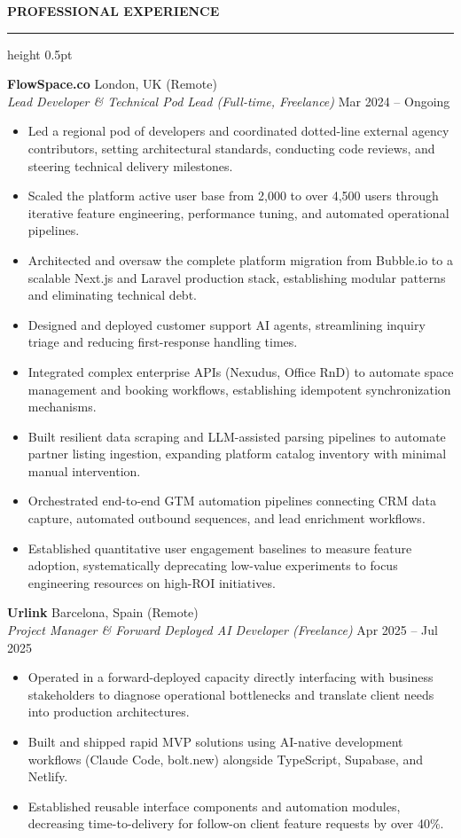 \documentclass[10pt, a4paper]{article}
\newcommand{\cvsection}[1]{%
  \vspace{6pt}%
  {\normalsize\bfseries\MakeUppercase{#1}}%
  \vspace{2pt}%
  \hrule height 0.5pt%
  \vspace{4pt}%
}
\begin{document}
\cvsection{Professional Experience}

\textbf{FlowSpace.co} \hfill London, UK (Remote)\\
\textit{Lead Developer \& Technical Pod Lead (Full-time, Freelance)} \hfill Mar 2024 -- Ongoing
\begin{itemize}
  \item Led a regional pod of developers and coordinated dotted-line external agency contributors, setting architectural standards, conducting code reviews, and steering technical delivery milestones.
  \item Scaled the platform active user base from 2,000 to over 4,500 users through iterative feature engineering, performance tuning, and automated operational pipelines.
  \item Architected and oversaw the complete platform migration from Bubble.io to a scalable Next.js and Laravel production stack, establishing modular patterns and eliminating technical debt.
  \item Designed and deployed customer support AI agents, streamlining inquiry triage and reducing first-response handling times.
  \item Integrated complex enterprise APIs (Nexudus, Office RnD) to automate space management and booking workflows, establishing idempotent synchronization mechanisms.
  \item Built resilient data scraping and LLM-assisted parsing pipelines to automate partner listing ingestion, expanding platform catalog inventory with minimal manual intervention.
  \item Orchestrated end-to-end GTM automation pipelines connecting CRM data capture, automated outbound sequences, and lead enrichment workflows.
  \item Established quantitative user engagement baselines to measure feature adoption, systematically deprecating low-value experiments to focus engineering resources on high-ROI initiatives.
\end{itemize}

\vspace{3pt}
\textbf{Urlink} \hfill Barcelona, Spain (Remote)\\
\textit{Project Manager \& Forward Deployed AI Developer (Freelance)} \hfill Apr 2025 -- Jul 2025
\begin{itemize}
  \item Operated in a forward-deployed capacity directly interfacing with business stakeholders to diagnose operational bottlenecks and translate client needs into production architectures.
  \item Built and shipped rapid MVP solutions using AI-native development workflows (Claude Code, bolt.new) alongside TypeScript, Supabase, and Netlify.
  \item Established reusable interface components and automation modules, decreasing time-to-delivery for follow-on client feature requests by over 40\%.
\end{itemize}
\end{document}
